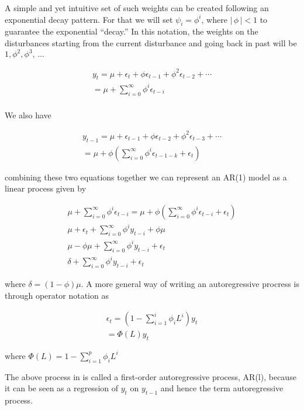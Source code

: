 \documentclass[
  11pt,
]{article}
\numberwithin{equation}{section}
\begin{document}
A simple and yet intuitive set of such weights can be created following
an exponential decay pattern. For that we will set
\(\psi_{i} = \phi^{i}\), where \(\left|\,\phi\,\right| < 1\) to
guarantee the exponential ``decay.'' In this notation, the weights on
the disturbances starting from the current disturbance and going back in
past will be \(1, \phi^{2}, \phi^{3},\, \ldots\)

\begin{gather*}
y_{t} = \mu + \epsilon_{t} + \phi\epsilon_{t-1} + \phi^{2}\epsilon_{t-2} + \cdots\\[8pt]
= \mu + \sum\limits_{i=0}^{\infty}\phi^{i}\epsilon_{t-i}
\\[8pt]
\end{gather*}

We also have

\begin{gather*}
y_{t-1} = \mu + \epsilon_{t-1} + \phi\epsilon_{t-2} + \phi^{2}\epsilon_{t-3} + \cdots \\[8pt]
= \mu + \phi\left(\sum\limits_{i=0}^{\infty}\phi^{i}\epsilon_{t-1-k} + \epsilon_{t}\right)
\end{gather*}

combining these two equations together we can represent an AR(1) model
as a linear process given by

\begin{gather*}
\mu + \sum\limits_{i=0}^{\infty}\phi^{i}\epsilon_{t-i} = \mu + \phi\left(\sum\limits_{i=0}^{\infty}\phi^{i}\epsilon_{t-i} + \epsilon_{t}\right) \\[8pt]
\mu + \epsilon_{t} + \sum\limits_{i=0}^{\infty}\phi^{i}y_{t-i} + \phi\mu \\[8pt]
\mu - \phi\mu + \sum\limits_{i=0}^{\infty}\phi^{i}y_{t-i} + \epsilon_{t} \\[8pt]
\delta + \sum\limits_{i=0}^{\infty}\phi^{i}y_{t- i} + \epsilon_{t}
\end{gather*}

where \(\delta = (1 - \phi)\mu\). A more general way of writing an
autoregressive procress is through operator notation as

\begin{gather*}
\epsilon_{t} = \left(1 - \sum\limits_{i=1}^{i}\phi_{i}L^{i} \right)y_{t} \\[8pt]
 = \Phi(L)y_{t}
\end{gather*}

where \(\Phi(L) = 1 - \sum\limits_{i=1}^{p}\phi_{i}L^{i}\)

The above process in is called a first-order autoregressive process,
AR(l), because it can be seen as a regression of \(y_{t}\) on
\(y_{t-1}\) and hence the term autoregressive process.
\end{document}

